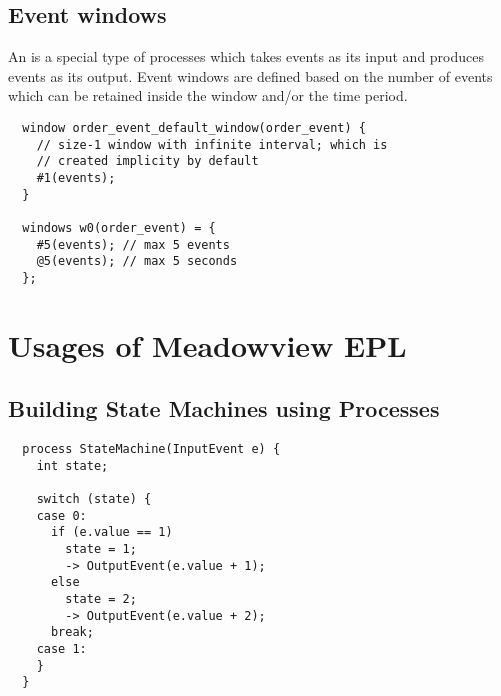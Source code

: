 \documentclass{pamsbook}
\begin{document}
\subsection{Event windows}
An  is a special type of processes which takes events as its
input and produces events as its output. Event windows are defined based on
the number of events which can be retained inside the window and/or the time
period. 
{\small
\begin{verbatim}
  window order_event_default_window(order_event) {
    // size-1 window with infinite interval; which is 
    // created implicity by default
    #1(events);
  }

  windows w0(order_event) = {
    #5(events); // max 5 events
    @5(events); // max 5 seconds
  };
\end{verbatim}
}


\section{Usages of Meadowview EPL}
\subsection{Building State Machines using Processes}
{\small
\begin{verbatim}
  process StateMachine(InputEvent e) {
    int state;
  
    switch (state) {
    case 0:
      if (e.value == 1)
        state = 1;
        -> OutputEvent(e.value + 1);
      else
        state = 2;
        -> OutputEvent(e.value + 2);
      break;
    case 1:
    }
  }
\end{verbatim}
}
\end{document}
